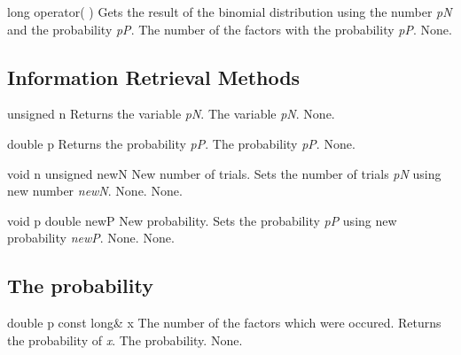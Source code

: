\clearpage

\setNormalInstance
\printEmptyMethodReturnSpecial
{long}
{operator( )}
{Gets the result of the binomial distribution using the number {\em pN} and
the probability {\em pP}.}
{The number of the factors with the probability {\em pP}.}
{None.}

\vspace*{10mm}

\subsection{Information Retrieval Methods}

\setConstInstance
\printEmptyMethodReturnSpecial
{unsigned}
{n}
{Returns the variable {\em pN}.}
{The variable {\em pN}.}
{None.}

\setConstInstance
\printEmptyMethodReturnSpecial
{double}
{p}
{Returns the probability {\em pP}.}
{The probability {\em pP}.}
{None.}

\setNormalInstance
\printMethodWithOneParam
{void}
{n}
{unsigned}
{newN}
{New number of trials.}
{Sets the number of trials {\em pN} using new number {\em newN}.}
{None.}
{None.}

\clearpage

\setNormalInstance
\printMethodWithOneParam
{void}
{p}
{double}
{newP}
{New probability.}
{Sets the probability {\em pP} using new probability {\em newP}.}
{None.}
{None.}

\vspace*{10mm}

\subsection{The probability}

\setConstInstance
\printMethodWithOneParam
{double}
{p}
{const long\&}
{x}
{The number of the factors which were occured.}
{Returns the probability of {\em x}.}
{The probability.}
{None.}




